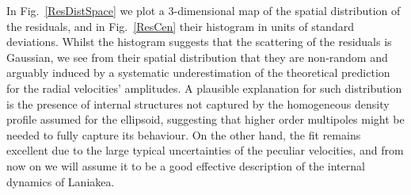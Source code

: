 \documentclass[notitlepage,nofootinbib]{revtex4-1}
\begin{document}
In Fig.~\ref{ResDistSpace} we plot a 3-dimensional map of the spatial distribution of the residuals, and in Fig.~\ref{ResCen} their histogram in units of standard deviations. Whilst the histogram suggests that the scattering of the residuals is Gaussian, we see from their spatial distribution that they are non-random and arguably induced by a systematic underestimation of the theoretical prediction for the radial velocities' amplitudes. A plausible explanation for such distribution is the presence of internal structures not captured by the homogeneous density profile assumed for the ellipsoid, suggesting that higher order multipoles might be needed to fully capture its behaviour. On the other hand, the fit remains excellent due to the large typical uncertainties of the peculiar velocities, and from now on we will assume it to be a good effective description of the internal dynamics of Laniakea.   
\end{document}
